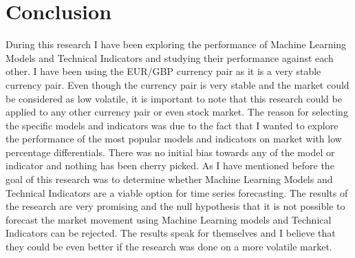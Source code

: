 \documentclass{imc-inf}
\begin{document}
	\section{Conclusion}
	During this research I have been exploring the performance of Machine Learning Models and Technical Indicators and studying their performance against each other. I have been using the EUR/GBP currency pair as it is a very stable currency pair.
	Even though the currency pair is very stable and the market could be considered as low volatile, it is important to note that this research could be applied to any other currency pair or even stock market.
	The reason for selecting the specific models and indicators was due to the fact that I wanted to explore the performance of the most popular models and indicators on market with low percentage differentials.
	There was no initial bias towards any of the model or indicator and nothing has been cherry picked. As I have mentioned before the goal of this research was to determine whether Machine Learning Models 
	and Technical Indicators are a viable option for time series forecasting. The results of the research are very promising and the null hypothesis that it is not possible to forecast the market movement using Machine Learning models
	and Technical Indicators can be rejected. The results speak for themselves and I believe that they could be even better if the research was done on a more volatile market.
	
	
	
	
	
	\backmatter%
	
	\typeout{}
	
	
\end{document}
